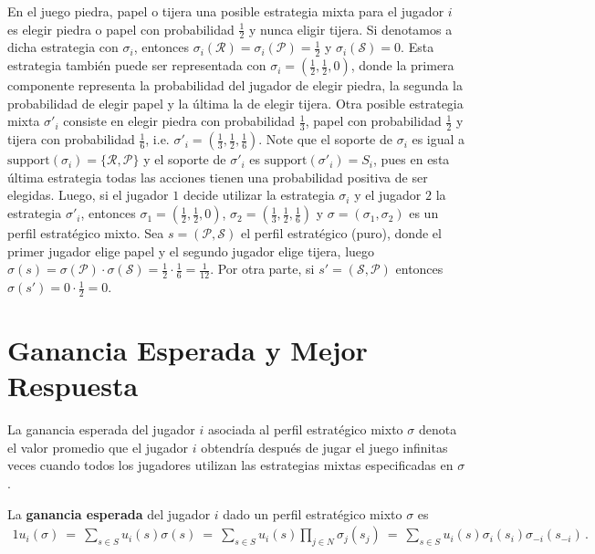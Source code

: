 En el juego piedra, papel o tijera una posible estrategia mixta para el jugador $i$ es elegir piedra o papel con probabilidad $\frac{1}{2}$ y nunca eligir tijera. Si denotamos a dicha estrategia con $\sigma_i$, entonces $\sigma_i(\mathcal{R}) = \sigma_i(\mathcal{P}) = \frac{1}{2}$ y $\sigma_i(\mathcal{S}) = 0$. Esta estrategia también puede ser representada con $\sigma_i = (\frac{1}{2}, \frac{1}{2}, 0)$, donde la primera componente representa la probabilidad del jugador de elegir piedra, la segunda la probabilidad de elegir papel y la última la de elegir tijera. Otra posible estrategia mixta $\sigma'_i$ consiste en elegir piedra con probabilidad $\frac{1}{3}$, papel con probabilidad $\frac{1}{2}$ y tijera con probabilidad $\frac{1}{6}$, i.e. $\sigma'_i = \left(\frac{1}{3}, \frac{1}{2}, \frac{1}{6} \right)$. Note que el soporte de $\sigma_i$ es igual a $\text{support}(\sigma_i) = \{\mathcal{R}, \mathcal{P} \}$ y el soporte de $\sigma'_{i}$ es $\text{support}(\sigma'_i) = S_i$, pues en esta última estrategia todas las acciones tienen una probabilidad positiva de ser elegidas. Luego, si el jugador $1$ decide utilizar la estrategia $\sigma_i$ y el jugador $2$ la estrategia $\sigma'_i$, entonces $\sigma_1 = \left( \frac{1}{2}, \frac{1}{2}, 0 \right)$, $\sigma_2 = \left(\frac{1}{3}, \frac{1}{2}, \frac{1}{6}\right)$ y $\sigma = (\sigma_1, \sigma_2)$ es un perfil estratégico mixto. Sea $s = (\mathcal{P}, \mathcal{S})$ el perfil estratégico (puro), donde el primer jugador elige papel y el segundo jugador elige tijera, luego $\sigma(s) = \sigma(\mathcal{P}) \cdot \sigma(\mathcal{S}) = \frac{1}{2} \cdot \frac{1}{6} = \frac{1}{12}$. Por otra parte, si $s' = (\mathcal{S}, \mathcal{P})$ entonces $\sigma(s') = 0 \cdot \frac{1}{2} = 0$.

\section{Ganancia Esperada y Mejor Respuesta}
La ganancia esperada del jugador $i$ asociada al perfil estratégico mixto $\sigma$ denota el valor promedio que el jugador $i$ obtendría después de jugar el juego infinitas veces cuando todos los jugadores utilizan las estrategias mixtas especificadas en $\sigma$. 

\begin{definition}
\label{def:ganancia-esperada}
La \textbf{ganancia esperada} del jugador $i$ dado un perfil estratégico mixto $\sigma$ es
\begin{alignat}{1}
	u_i(\sigma)\ =\ \sum_{s \in S} u_i(s) \sigma(s)\ =\ \sum_{s \in S} u_i(s) \prod _{j \in N} \sigma_j(s_j)\ =\ \sum_{s \in S} u_i(s) \sigma_i(s_i) \sigma_{-i}(s_{-i})\,.
\end{alignat}
\end{definition}

